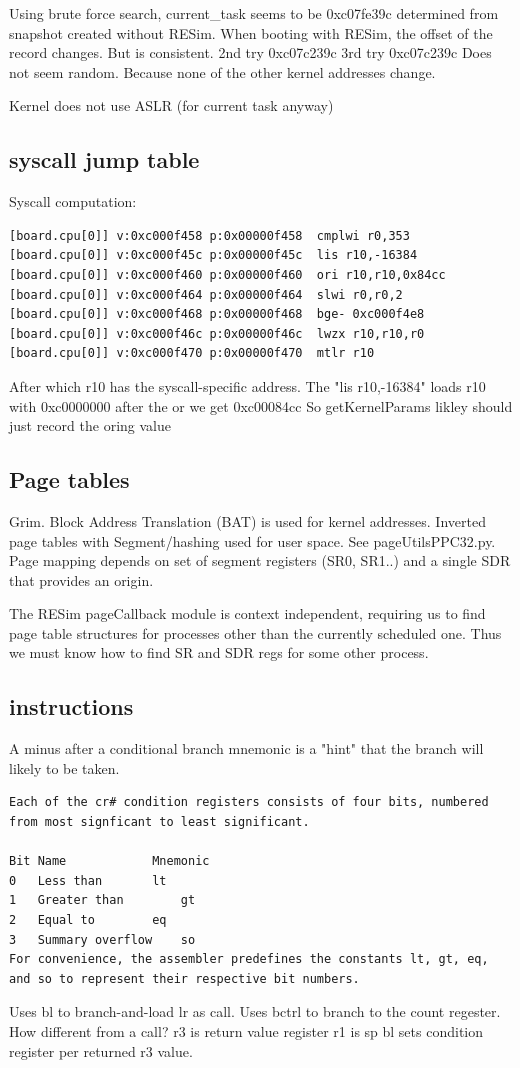 \documentclass[titlepage]{article}
\begin{document}
\begin{appendices}
Using brute force search, current\_task seems to be 0xc07fe39c
determined from snapshot created without RESim.
When booting with RESim, the offset of the record changes.
But is consistent.
2nd try                                             0xc07c239c
3rd try                                             0xc07c239c
Does not seem random.  Because none of the other kernel addresses change.

Kernel does not use ASLR (for current task anyway)

\subsection{syscall jump table}
Syscall computation:
\begin{verbatim}
[board.cpu[0]] v:0xc000f458 p:0x00000f458  cmplwi r0,353
[board.cpu[0]] v:0xc000f45c p:0x00000f45c  lis r10,-16384
[board.cpu[0]] v:0xc000f460 p:0x00000f460  ori r10,r10,0x84cc
[board.cpu[0]] v:0xc000f464 p:0x00000f464  slwi r0,r0,2
[board.cpu[0]] v:0xc000f468 p:0x00000f468  bge- 0xc000f4e8
[board.cpu[0]] v:0xc000f46c p:0x00000f46c  lwzx r10,r10,r0
[board.cpu[0]] v:0xc000f470 p:0x00000f470  mtlr r10
\end{verbatim}
After which r10 has the syscall-specific address.
The "lis r10,-16384" loads r10 with 0xc0000000
after the or we get 0xc00084cc
So getKernelParams likley should just record the oring value


\subsection{Page tables}
Grim.  
Block Address Translation (BAT) is used for kernel addresses.
Inverted page tables with Segment/hashing used for user space.  See pageUtilsPPC32.py.
Page mapping depends on set of segment registers (SR0, SR1..) and a single SDR that provides an origin.

The RESim pageCallback module is context independent, requiring us to find page table structures for
processes other than the currently scheduled one.  Thus we must know how to find SR and SDR regs for
some other process.

\subsection{instructions}
A minus after a conditional branch mnemonic is a "hint" that the branch will likely to be taken.
\begin{verbatim}
Each of the cr# condition registers consists of four bits, numbered from most signficant to least significant.

Bit	Name			Mnemonic
0	Less than		lt
1	Greater than		gt
2	Equal to		eq
3	Summary overflow	so
For convenience, the assembler predefines the constants lt, gt, eq, and so to represent their respective bit numbers.
\end{verbatim}
Uses bl to branch-and-load lr as call.
Uses bctrl to branch to the count regester.  How different from a call?
r3 is return value register
r1 is sp
bl sets condition register per returned r3 value.

\end{appendices}
\end{document}
